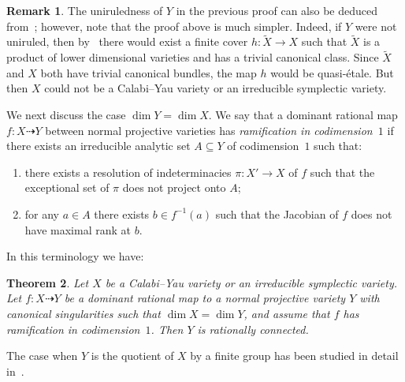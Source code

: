 \documentclass[11pt]{article}
\newtheorem{theo}{Theorem}[section]
\theoremstyle{definition}
\newtheorem{rema}[theo]{Remark}
\numberwithin{equation}{section}
\numberwithin{figure}{section}
\numberwithin{table}{section}
\newcommand*{\romanenumi}{\renewcommand*{\theenumi}{\roman{enumi}}}
\begin{document}
\begin{rema}\label{rema:main3.3}
The uniruledness of $Y$ in the previous proof can also be deduced from~\cite[Theorem~14]{KL09}; however, note that the proof above is much simpler. Indeed, if $Y$ were not uniruled, then by~\cite[Theorem~14]{KL09} there would exist a finite cover $h\colon \widetilde X \to X$ such that $\widetilde X$ is a product of lower dimensional varieties and has a trivial canonical class. Since $\widetilde X$ and $X$ both have trivial canonical bundles, the map $h$ would be quasi-étale. But then $X$ could not be a Calabi--Yau variety or an irreducible symplectic variety.
\end{rema}

We next discuss the case $\dim Y = \dim X.$ We say that a dominant rational map $f\colon X\dashrightarrow Y$ between normal projective varieties has \emph{ramification in codimension~$1$} if there exists an irreducible analytic set $A \subseteq Y$ of codimension~$1$ such that:
\begin{enumerate}\romanenumi
\item \label{list-sec3.1}there exists a resolution of indeterminacies $\pi\colon X' \to X$ of $f$ such that the exceptional set of $\pi$ does not project onto $A$;
\item \label{list-sec3.2}for any $a \in A$ there exists $b \in f^{-1}(a)$ such that the Jacobian of $f$ does not have maximal rank at $b$.
\end{enumerate}

In this terminology we have:
\begin{theo}\label{thm1-2}
Let $X$ be a Calabi--Yau variety or an irreducible symplectic variety. Let $f\colon X \dasharrow Y$ be a dominant rational map to a normal projective variety $Y$ with canonical singularities such that $\dim X = \dim Y$, and assume that $f$ has ramification in codimension~$1$. Then $Y$ is rationally connected.
\end{theo}

The case when $Y$ is the quotient of $X$ by a finite group has been studied in detail in~\cite{KL09}.
\end{document}
